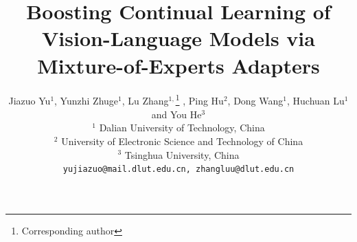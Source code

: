 \documentclass[10pt,twocolumn,letterpaper]{article}
\title{Boosting Continual Learning of Vision-Language Models via Mixture-of-Experts Adapters}
\author{
    {Jiazuo Yu$^{1}$, Yunzhi Zhuge$^{1}$, Lu Zhang$^{1,}$\thanks{Corresponding author} , Ping Hu$^{2}$, Dong Wang$^{1}$, Huchuan Lu$^{1}$ and You He$^{3}$}\\
    {$^1$ Dalian University of Technology, China}\\
    {$^2$ University of Electronic Science and Technology of China}\\
    {$^3$ Tsinghua University, China}\\
    {\tt\small yujiazuo@mail.dlut.edu.cn, zhangluu@dlut.edu.cn} \\
    }
\begin{document}
\maketitle
    






%
{
    \small
    
    
}

\end{document}
